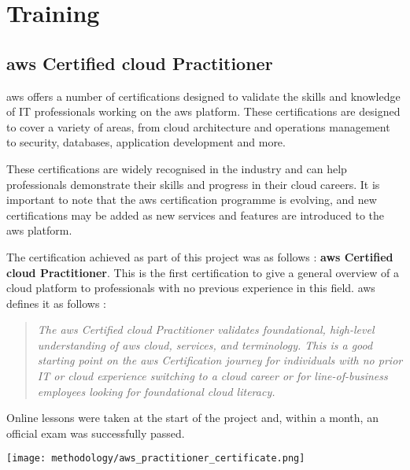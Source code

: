 \section{Training}

\subsection{\gls{aws} Certified \Gls{cloud} Practitioner}
\gls{aws} offers a number of certifications designed to validate the skills and knowledge of IT professionals working on the \gls{aws} platform. These certifications are designed to cover a variety of areas, from cloud architecture and operations management to security, databases, application development and more.

These certifications are widely recognised in the industry and can help professionals demonstrate their skills and progress in their \gls{cloud} careers. It is important to note that the \gls{aws} certification programme is evolving, and new certifications may be added as new services and features are introduced to the \gls{aws} platform.

The certification achieved as part of this project was as follows : \textbf{\gls{aws} Certified \Gls{cloud} Practitioner}. This is the first certification to give a general overview of a \gls{cloud} platform to professionals with no previous experience in this field. \gls{aws} defines it as follows :
\begin{quote}
    \textit{The \gls{aws} Certified \Gls{cloud} Practitioner validates foundational, high-level understanding of \gls{aws} \Gls{cloud}, services, and terminology.  This is a good starting point on the \gls{aws} Certification journey for individuals with no prior IT or \gls{cloud} experience switching to a \gls{cloud} career or for line-of-business employees looking for foundational cloud literacy. \cite{aws_practitioner_certificate}}\\
\end{quote}
Online lessons were taken at the start of the project and, within a month, an official exam was successfully passed.
\begin{center}
    \begingroup
    \texttt{[image: methodology/aws\_practitioner\_certificate.png]}
    \label{fig:aws_practitioner_certificate}
    \endgroup
\end{center}